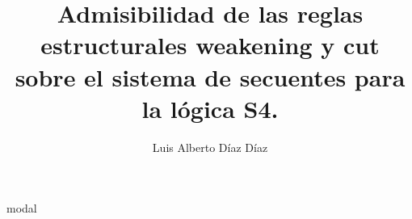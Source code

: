 \documentclass[12pt,twoside,a4paper]{report}
\begin{document}
\title{Admisibilidad de las reglas estructurales weakening y cut sobre el sistema de secuentes para la lógica S4.}

\author{Luis Alberto Díaz Díaz}

\maketitle


{modal}
\end{document}
